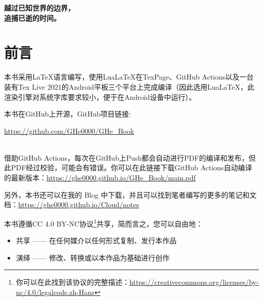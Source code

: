 \documentclass{gbook}
\begin{document}
\everymath{\displaystyle}

\setlength{\lineskip}{2.5pt}
\setlength{\lineskiplimit}{2.5pt}

 

\newpage

\thispagestyle{empty}
\vspace*{\fill}
\begin{center}
\Huge{\textbf{越过已知世界的边界，\\
追捕已逝的时间。}}
\end{center}
\vspace*{\fill}

\newpage


\setcounter{page}{1}

\section*{前言}


本书采用\LaTeX 语言编写，使用Lua\LaTeX 在TexPage、GitHub Actions以及一台装有Tex Live 2021的Android平板三个平台上完成编译（因此选用Lua\LaTeX，此渲染引擎对系统字库要求较小，便于在Android设备中运行）。
~\\

\begin{minipage}[b]{0.62\linewidth}
本书在GitHub上开源，GitHub项目链接:

\url{https://github.com/GHe0000/GHe_Book} 
\end{minipage}
\hfill
\begin{minipage}[b]{0.1\linewidth}
\end{minipage}
~\\

借助GitHub Actions，每次在GitHub上Push都会自动进行PDF的编译和发布，但此PDF经过校验，可能会有错误。你可以在此链接下载GitHub Actions自动编译的最新版本：\url{https://ghe0000.github.io/GHe_Book/main.pdf}

另外，本书还可以在我的 Blog 中下载，并且可以找到笔者编写的更多的笔记和文档：\url{https://ghe0000.github.io/Cloud/notes}

本书遵循CC 4.0 BY-NC协议\footnote{你可以在此找到该协议的完整描述：\url{https://creativecommons.org/licenses/by-nc/4.0/legalcode.zh-Hans}}共享，简而言之，您可以自由地：
\begin{itemize}
    \item 共享 —— 在任何媒介以任何形式复制、发行本作品
    \item 演绎 —— 修改、转换或以本作品为基础进行创作
\end{itemize}
\end{document}
